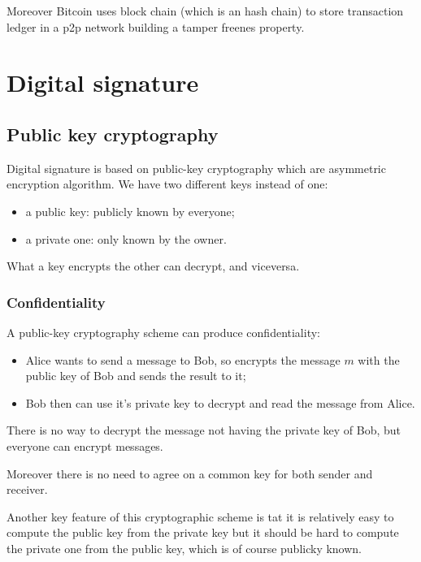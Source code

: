 Moreover Bitcoin uses block chain (which is an hash chain) to store transaction ledger in a p2p network building a tamper freenes property.

\section{Digital signature}
\subsection{Public key cryptography}
Digital signature is based on public-key cryptography which are asymmetric encryption algorithm.
We have two different keys instead of one:
\begin{itemize}
    \item a public key: publicly known by everyone;
    \item a private one: only known by the owner.
\end{itemize}
What a key encrypts the other can decrypt, and viceversa.

\subsubsection{Confidentiality}
A public-key cryptography scheme can produce confidentiality:
\begin{itemize}
    \item Alice wants to send a message to Bob, so encrypts the message $m$ with the public key of Bob and sends the result to it;
    \item Bob then can use it's private key to decrypt and read the message from Alice.
\end{itemize}
There is no way to decrypt the message not having the private key of Bob, but everyone can encrypt messages.

Moreover there is no need to agree on a common key for both sender and receiver.

Another key feature of this cryptographic scheme is tat it is relatively easy to compute the public key from the private key but it should be hard to compute the private one from the public key, which is of course publicky known.

